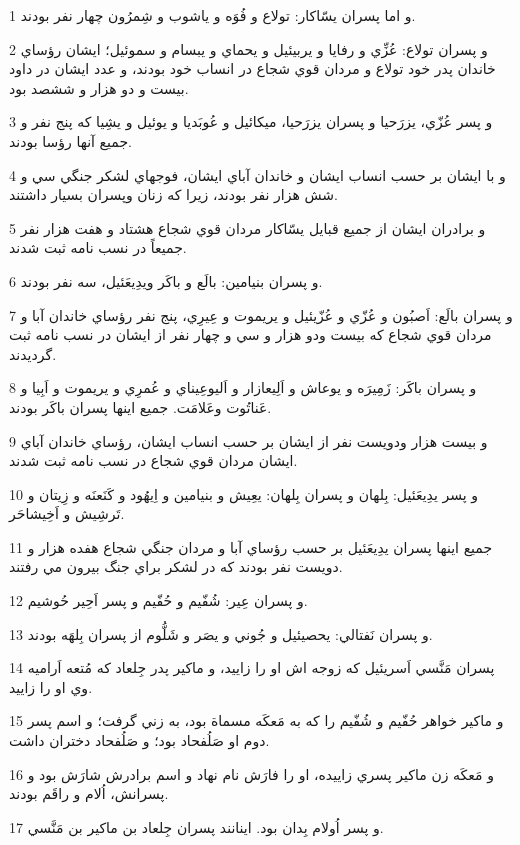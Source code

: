 \par 1 و اما پسران يسّاکار: تولاع و فُوَه و ياشوب و شِمرُون چهار نفر بودند.
\par 2 و پسران تولاع: عُزِّي و رفايا و يربيئيل و يحماي و يبسام و سموئيل؛ ايشان رؤساي خاندان پدر خود تولاع و مردان قوي شجاع در انساب خود بودند، و عدد ايشان در داود بيست و دو هزار و ششصد بود.
\par 3 و پسر عُزّي، يزرَحيا و پسران يزرَحيا، ميکائيل و عُوبَديا و يوئيل و يشِيا که پنج نفر و جميع آنها رؤسا بودند.
\par 4 و با ايشان بر حسب انساب ايشان و خاندان آباي ايشان، فوجهاي لشکر جنگي سي و شش هزار نفر بودند، زيرا که زنان وپسران بسيار داشتند.
\par 5 و برادران ايشان از جميع قبايل يسّاکار مردان قوي شجاع هشتاد و هفت هزار نفر جميعاً در نسب نامه ثبت شدند.
\par 6 و پسران بنيامين: بالَع و باکَر ويدِيعَئيل، سه نفر بودند.
\par 7 و پسران بالَع: اَصبُون و عُزّي و عُزّيئيل و يريموت و عِيرِي، پنج نفر رؤساي خاندان آبا و مردان قوي شجاع که بيست ودو هزار و سي و چهار نفر از ايشان در نسب نامه ثبت گرديدند.
\par 8 و پسران باکَر: زَمِيرَه و يوعاش و اَلِيعازار و اَليوعِيناي و عُمرِي و يريموت و اَبِيا و عَناتُوت وعَلامَت. جميع اينها پسران باکَر بودند.
\par 9 و بيست هزار ودويست نفر از ايشان بر حسب انساب ايشان، رؤساي خاندان آباي ايشان مردان قوي شجاع در نسب نامه ثبت شدند.
\par 10 و پسر يدِيعَئيل: بِلهان و پسران بِلهان: يعِيش و بنيامين و اِيهُود و کَنَعنَه و زِيتان و تَرشِيش و اَخِيشاحَر.
\par 11 جميع اينها پسران يدِيعَئيل بر حسب رؤساي آبا و مردان جنگي شجاع هفده هزار و دويست نفر بودند که در لشکر براي جنگ بيرون مي رفتند.
\par 12 و پسران عِير: شُفّيم و حُفّيم و پسر اَحِير حُوشيم.
\par 13 و پسران نَفتالي: يحصيئيل و جُوني و يصَر و شَلُّوم از پسران بِلهَه بودند.
\par 14 پسران مَنَّسي اَسريئيل که زوجه اش او را زاييد، و ماکير پدر جِلعاد که مُتعه اَراميه وي او را زاييد.
\par 15 و ماکير خواهر حُفّيم و شُفّيم را که به مَعکَه مسماة بود، به زني گرفت؛ و اسم پسر دوم او صَلُفحاد بود؛ و صَلُفحاد دختران داشت.
\par 16 و مَعکَه زن ماکير پسري زاييده، او را فارَش نام نهاد و اسم برادرش شارَش بود و پسرانش، اُلام و راقَم بودند.
\par 17 و پسر اُولام بِدان بود. اينانند پسران جِلعاد بن ماکير بن مَنَّسي.
